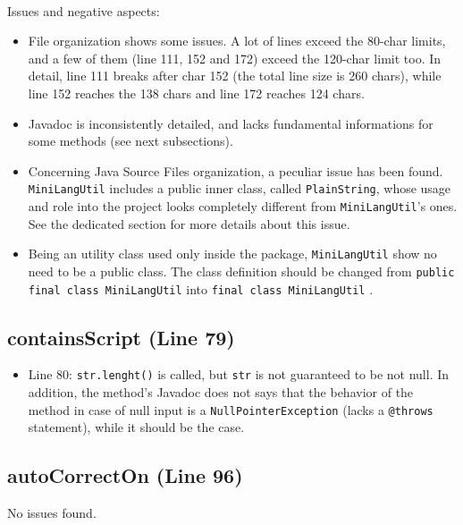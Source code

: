 \documentclass[11pt]{article} %
\begin{document}
\hfill\\
Issues and negative aspects:
\begin{itemize}
	\item File organization shows some issues. A lot of lines exceed the 80-char limits, and a few of them (line 111, 152 and 172) exceed the 120-char limit too. In detail, line 111 breaks after char 152 (the total line size is 260 chars), while line 152 reaches the 138 chars and line 172 reaches 124 chars.

	\item Javadoc is inconsistently detailed, and lacks fundamental informations for some methods (see next subsections).

	\item Concerning Java Source Files organization, a peculiar issue has been found. \texttt{MiniLangUtil} includes a public inner class, called \texttt{PlainString}, whose usage and role into the project looks completely different from \texttt{MiniLangUtil}'s ones. See the dedicated section for more details about this issue.

	\item Being an utility class used only inside the package, \texttt{MiniLangUtil} show no need to be a public class. The class definition should be changed from \texttt{public final class MiniLangUtil} into \texttt{final class MiniLangUtil}
. 

\end{itemize}

\subsection{containsScript (Line 79)}
\begin{itemize}
	\item Line 80: \texttt{str.lenght()} is called, but \texttt{str} is not guaranteed to be not null. In addition, the method's Javadoc does not says that the behavior of the method in case of null input is a \texttt{NullPointerException} (lacks a \texttt{@throws} statement), while it should be the case.
\end{itemize}

\subsection{autoCorrectOn (Line 96)}
No issues found.
\end{document}
